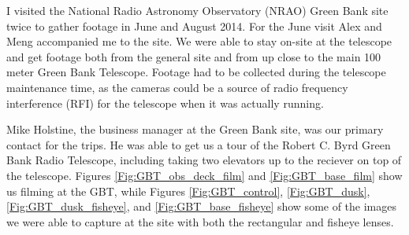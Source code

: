 I visited the National Radio Astronomy Observatory (NRAO) Green Bank site twice to gather footage in June and August 2014. For the June visit Alex and Meng accompanied me to the site. We were able to stay on-site at the telescope and get footage both from the general site and from up close to the main 100 meter Green Bank Telescope. Footage had to be collected during the telescope maintenance time, as the cameras could be a source of radio frequency interference (RFI) for the telescope when it was actually running.

Mike Holstine, the business manager at the Green Bank site, was our primary contact for the trips. He was able to get us a tour of the Robert C. Byrd Green Bank Radio Telescope, including taking two elevators up to the reciever on top of the telescope. Figures \ref{Fig:GBT_obs_deck_film} and \ref{Fig:GBT_base_film} show us filming at the GBT, while Figures \ref{Fig:GBT_control}, \ref{Fig:GBT_dusk}, \ref{Fig:GBT_dusk_fisheye}, and \ref{Fig:GBT_base_fisheye} show some of the images we were able to capture at the site with both the rectangular and fisheye lenses. 

